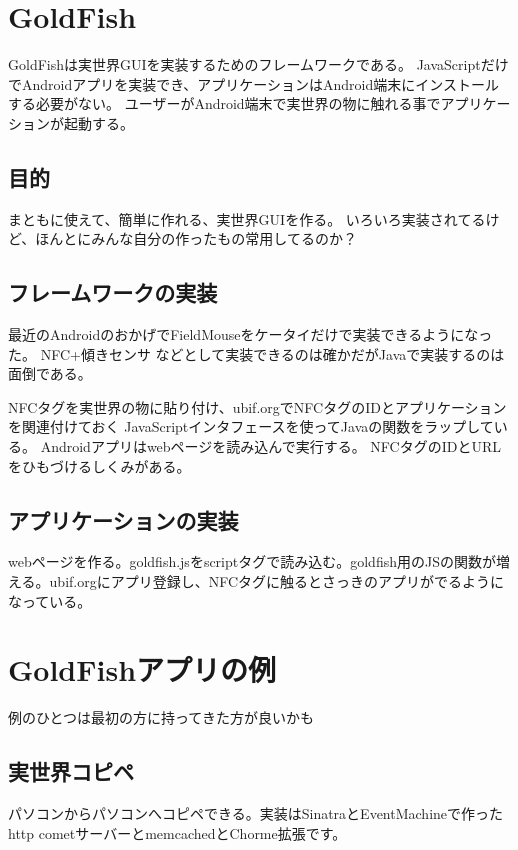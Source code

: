 \section{GoldFish}

GoldFishは実世界GUIを実装するためのフレームワークである。
JavaScriptだけでAndroidアプリを実装でき、アプリケーションはAndroid端末にインストールする必要がない。
ユーザーがAndroid端末で実世界の物に触れる事でアプリケーションが起動する。

\subsection{目的}

まともに使えて、簡単に作れる、実世界GUIを作る。
いろいろ実装されてるけど、ほんとにみんな自分の作ったもの常用してるのか？

\subsection{フレームワークの実装}

最近のAndroidのおかげでFieldMouseをケータイだけで実装できるようになった。
NFC+傾きセンサ などとして実装できるのは確かだがJavaで実装するのは面倒である。

NFCタグを実世界の物に貼り付け、ubif.orgでNFCタグのIDとアプリケーションを関連付けておく
JavaScriptインタフェースを使ってJavaの関数をラップしている。
Androidアプリはwebページを読み込んで実行する。
NFCタグのIDとURLをひもづけるしくみがある。

\subsection{アプリケーションの実装}

webページを作る。goldfish.jsをscriptタグで読み込む。goldfish用のJSの関数が増える。ubif.orgにアプリ登録し、NFCタグに触るとさっきのアプリがでるようになっている。


\section{GoldFishアプリの例}

例のひとつは最初の方に持ってきた方が良いかも

\subsection{実世界コピペ}
パソコンからパソコンへコピペできる。実装はSinatraとEventMachineで作ったhttp cometサーバーとmemcachedとChorme拡張です。

